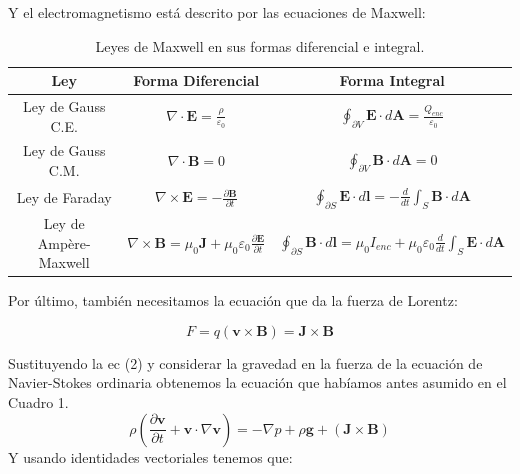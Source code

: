 \documentclass[article,12pt]{elsarticle}
\begin{document}
   
    Y el electromagnetismo está descrito por las ecuaciones de Maxwell:
    \begin{table}[h!]
\centering
\begin{tabular}{|c|c|c|}
\hline
\textbf{Ley}                  & \textbf{Forma Diferencial}                                                                                         & \textbf{Forma Integral}                                                                                             \\ \hline
Ley de Gauss C.E.    & $\nabla \cdot \mathbf{E} = \frac{\rho}{\varepsilon_0}$                                                             & $\oint_{\partial V} \mathbf{E} \cdot d\mathbf{A} = \frac{Q_{enc}}{\varepsilon_0}$                                     \\ \hline
Ley de Gauss C.M.    & $\nabla \cdot \mathbf{B} = 0$                                                                                      & $\oint_{\partial V} \mathbf{B} \cdot d\mathbf{A} = 0$                                                                 \\ \hline
Ley de Faraday                      & $\nabla \times \mathbf{E} = -\frac{\partial \mathbf{B}}{\partial t}$                                                & $\oint_{\partial S} \mathbf{E} \cdot d\mathbf{l} = -\frac{d}{dt} \int_S \mathbf{B} \cdot d\mathbf{A}$                  \\ \hline
Ley de Ampère-Maxwell             & $\nabla \times \mathbf{B} = \mu_0 \mathbf{J} + \mu_0 \varepsilon_0 \frac{\partial \mathbf{E}}{\partial t}$           & $\oint_{\partial S} \mathbf{B} \cdot d\mathbf{l} = \mu_0 I_{enc} + \mu_0 \varepsilon_0 \frac{d}{dt} \int_S \mathbf{E} \cdot d\mathbf{A}$ \\ \hline
\end{tabular}
\caption{Leyes de Maxwell en sus formas diferencial e integral.}
\label{tab:LeyesMaxwell}
\end{table}
 
    Por último, también necesitamos la ecuación que da la fuerza de Lorentz:

    \begin{equation}
        F = q(\mathbf{v} \times \mathbf{B}) = \mathbf{J} \times \mathbf{B}
    \end{equation}

    Sustituyendo la ec (2) y considerar la gravedad en la fuerza de la ecuación de Navier-Stokes ordinaria obtenemos la ecuación que habíamos antes asumido en el Cuadro 1.
    \begin{equation*}
        \rho \left( \frac{\partial \mathbf{v}}{\partial t} + \mathbf{v} \cdot \nabla \mathbf{v} \right) = -\nabla p + \rho \textbf{g} + (\mathbf{J} \times \mathbf{B})
    \end{equation*}
    Y usando identidades vectoriales tenemos que:
    
\end{document}
